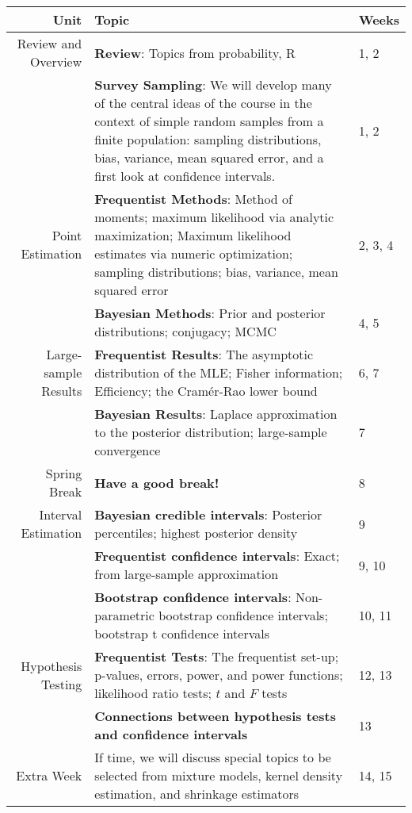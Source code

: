 \documentclass[11pt]{article}
\begin{document}
\begin{table}[!h]
\begin{tabular}{r p{11cm} l}
\toprule
Unit & Topic & Weeks \\
\midrule
Review and Overview & \textbf{Review}: Topics from probability, R & 1, 2 \\
\cmidrule(r){2-3}
 & \textbf{Survey Sampling}: We will develop many of the central ideas of the course in the context of simple random samples from a finite population: sampling distributions, bias, variance, mean squared error, and a first look at confidence intervals. & 1, 2 \\
\midrule
Point Estimation & \textbf{Frequentist Methods}: Method of moments; maximum likelihood via analytic maximization; Maximum likelihood estimates via numeric optimization; sampling distributions; bias, variance, mean squared error & 2, 3, 4 \\
\cmidrule(r){2-3}
 & \textbf{Bayesian Methods}: Prior and posterior distributions; conjugacy; MCMC & 4, 5 \\
\midrule
Large-sample Results & \textbf{Frequentist Results}: The asymptotic distribution of the MLE; Fisher information; Efficiency; the Cram\'{e}r-Rao lower bound & 6, 7 \\
\cmidrule(r){2-3}
 & \textbf{Bayesian Results}: Laplace approximation to the posterior distribution; large-sample convergence & 7 \\
 \midrule
Spring Break & \textbf{Have a good break!} & 8 \\
\midrule
Interval Estimation & \textbf{Bayesian credible intervals}: Posterior percentiles; highest posterior density & 9 \\
\cmidrule(r){2-3}
 & \textbf{Frequentist confidence intervals}: Exact; from large-sample approximation & 9, 10 \\
\cmidrule(r){2-3}
 & \textbf{Bootstrap confidence intervals}: Non-parametric bootstrap confidence intervals; bootstrap t confidence intervals & 10, 11 \\
\midrule
Hypothesis Testing & \textbf{Frequentist Tests}: The frequentist set-up; p-values, errors, power, and power functions; likelihood ratio tests; $t$ and $F$ tests & 12, 13 \\
\cmidrule(r){2-3}
 & \textbf{Connections between hypothesis tests and confidence intervals} & 13 \\
\midrule
Extra Week & If time, we will discuss special topics to be selected from mixture models, kernel density estimation, and shrinkage estimators & 14, 15 \\
\bottomrule
\end{tabular}
\end{table}
\end{document}
